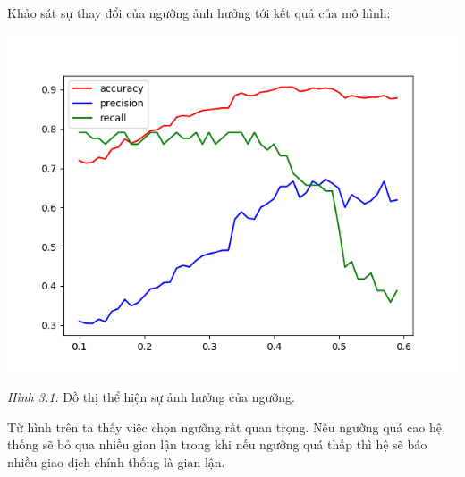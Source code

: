 Khảo sát sự thay đổi của ngưỡng ảnh hưởng tới kết quả của mô hình:
\begin{center}
	
	\includegraphics[scale=1]{31.png}
	
	
	\textit{Hình 3.1:} Đồ thị thể hiện sự ảnh hưởng của ngưỡng.
\end{center}
Từ hình trên ta thấy việc chọn ngưỡng rất quan trọng. Nếu ngưỡng quá cao hệ thống sẽ bỏ qua nhiều gian lận trong khi nếu ngưỡng quá thấp thì hệ sẽ báo nhiều giao dịch chính thống là gian lận.